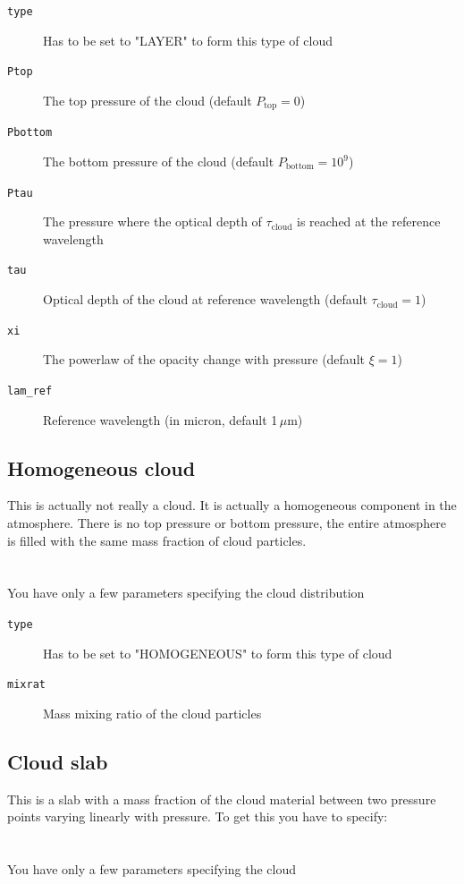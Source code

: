 \documentclass[12pt]{article}
\begin{document}
\begin{description}
\item[\texttt{type}]
Has to be set to "LAYER" to form this type of cloud
\item[\texttt{Ptop}]
The top pressure of the cloud (default $P_\mathrm{top}=0$)
\item[\texttt{Pbottom}]
The bottom pressure of the cloud (default $P_\mathrm{bottom}=10^9$)
\item[\texttt{Ptau}]
The pressure where the optical depth of $\tau_\mathrm{cloud}$ is reached at the reference wavelength
\item[\texttt{tau}]
Optical depth of the cloud at reference wavelength (default $\tau_\mathrm{cloud}=1$)
\item[\texttt{xi}]
The powerlaw of the opacity change with pressure (default $\xi=1$)
\item[\texttt{lam\_ref}]
Reference wavelength (in micron, default 1\,$\mu$m)
\end{description}

\subsection{Homogeneous cloud}

This is actually not really a cloud. It is actually a homogeneous component in the atmosphere. There is no top pressure or bottom pressure, the entire atmosphere is filled with the same mass fraction of cloud particles.
\\
\\
\\
You have only a few parameters specifying the cloud distribution

\begin{description}
\item[\texttt{type}]
Has to be set to "HOMOGENEOUS" to form this type of cloud
\item[\texttt{mixrat}]
Mass mixing ratio of the cloud particles
\end{description}


\subsection{Cloud slab}

This is a slab with a mass fraction of the cloud material between two pressure points varying linearly with pressure. To get this you have to specify:
\\
\\
\\
You have only a few parameters specifying the cloud
\end{document}
